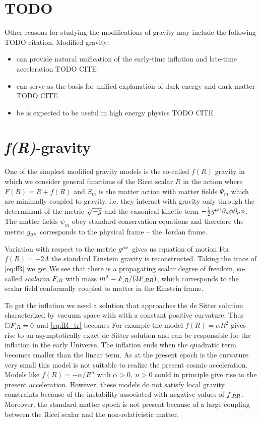 \section{TODO}
Other reasons for studying the modifications of gravity may include the following TODO citation. Modified gravity:
\begin{itemize}
	\item can provide natural unification of the early-time inflation and late-time acceleration TODO CITE
	\item can serve as the basis for unified explanation of dark energy and dark matter TODO CITE
	\item be is expected to be useful in high energy physics TODO CITE
\end{itemize}

\section{\textit{f(R)}-gravity}
One of the simplest modified gravity models is the so-called $f(R)$ gravity in which we consider general functions of the Ricci scalar $R$ in the action
where $F(R)=R+f(R)$ and $S_m$ is the matter action with matter fields $\Psi_m$ which are minimally coupled to gravity, i.e. they interact with gravity only through the determinant of the metric $\sqrt{-g}$ and the canonical kinetic term $-\frac12g^{\mu\nu}\partial_\mu\phi\partial_\nu\phi$. The matter fields $\psi_m$ obey standard conservation equations and therefore the metric $g_{\mu\nu}$ corresponds to the physical frame -- the Jordan frame.

Variation with respect to the metric $g^{\mu\nu}$ gives us equation of motion
For $f(R)=-2\Lambda$ the standard Einstein gravity is reconstructed. Taking the trace of \eqref{eq:fR} we get
We see that there is a propagating scalar degree of freedom, so-called \textit{scalaron} $F_{,R}$ with mass $m^2=F_{,R}/(3F_{,RR})$, which corresponds to the scalar field conformally coupled to matter in the Einstein frame.

To get the inflation we need a solution that approaches the de Sitter solution characterized by vacuum space with with a constant positive curvature. Thus $\Box F_{,R}=0$ and \eqref{eq:fR_tr} becomes
For example the model $f(R)=\alpha R^2$ gives rise to an asymptotically exact de Sitter solution and can be responsible for the inflation in the early Universe. The inflation ends when the quadratic term becomes smaller than the linear term. As at the present epoch is the curvature very small this model is not suitable to realize the present cosmic acceleration. Models like $f(R)=-\alpha/R^n$ with $\alpha>0,\ n>0$ could in principle give rise to the present acceleration. However, these models do not satisfy local gravity constraints because of the instability associated with negative values of $f_{,RR}$. Moreover, the standard matter epoch is not present because of a large coupling between the Ricci scalar and the non-relativistic matter.


